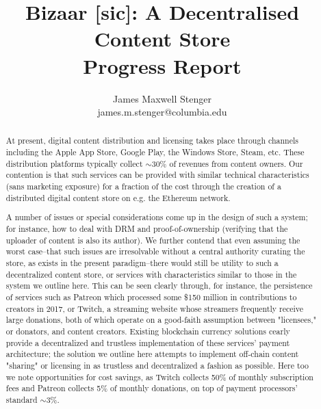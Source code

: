 \documentclass[12pt,oneside]{amsart}
\title{Bizaar [sic]: A Decentralised Content Store\\ {\smaller \textbf{Progress Report \YellowPaperVersionNumber}}}
\author{
    James Maxwell Stenger\\
    james.m.stenger@columbia.edu
}
\begin{document}
\pagecolor{pagecolor}

\begin{abstract}
At present, digital content distribution and licensing takes place through channels including the Apple App Store, Google Play, the Windows Store, Steam, etc.
These distribution platforms typically collect $\sim$30\% of revenues from content owners.
Our contention is that such services can be provided with similar technical characteristics (sans marketing exposure) for a fraction of the cost through the creation of a distributed digital content store on e.g. the Ethereum network.

A number of issues or special considerations come up in the design of such a system; for instance, how to deal with DRM and proof-of-ownership (verifying that the uploader of content is also its author).
We further contend that even assuming the worst case--that such issues are irresolvable without a central authority curating the store, as exists in the present paradigm--there would still be utility to such a decentralized content store, or services with characteristics similar to those in the system we outline here.
This can be seen clearly through, for instance, the persistence of services such as Patreon which processed some \$150 million in contributions to creators in 2017, or Twitch, a streaming website whose streamers frequently receive large donations, both of which operate on a good-faith assumption between "licensees," or donators, and content creators.
Existing blockchain currency solutions cearly provide a decentralized and trustless implementation of these services' payment architecture; the solution we outline here attempts to implement off-chain content "sharing" or licensing in as trustless and decentralized a fashion as possible.
Here too we note opportunities for cost savings, as Twitch collects 50\% of monthly subscription fees and Patreon collects 5\% of monthly donations, on top of payment processors' standard $\sim$3\%.
\end{abstract}

\maketitle
\end{document}
